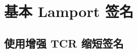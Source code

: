 \section{基本 Lamport 签名}\label{sec:14-1}

\begin{theorem}\label{theo:14-1}
	
\end{theorem}

\subsection{使用增强 TCR 缩短签名}\label{subsec:14-1-1}